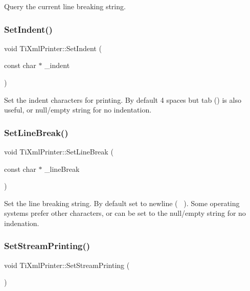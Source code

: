 Query the current line breaking string. 

\mbox{\label{class_ti_xml_printer_a213377a4070c7e625bae59716b089e5e}} 
\subsubsection{\texorpdfstring{Set\+Indent()}{SetIndent()}}
{\footnotesize\ttfamily void Ti\+Xml\+Printer\+::\+Set\+Indent (\begin{DoxyParamCaption}\item[{const char $\ast$}]{\+\_\+indent }\end{DoxyParamCaption})\hspace{0.3cm}{\ttfamily [inline]}}

Set the indent characters for printing. By default 4 spaces but tab () is also useful, or null/empty string for no indentation. \mbox{\label{class_ti_xml_printer_a4be1e37e69e3858c59635aa947174fe6}} 
\subsubsection{\texorpdfstring{Set\+Line\+Break()}{SetLineBreak()}}
{\footnotesize\ttfamily void Ti\+Xml\+Printer\+::\+Set\+Line\+Break (\begin{DoxyParamCaption}\item[{const char $\ast$}]{\+\_\+line\+Break }\end{DoxyParamCaption})\hspace{0.3cm}{\ttfamily [inline]}}

Set the line breaking string. By default set to newline (~\newline
). Some operating systems prefer other characters, or can be set to the null/empty string for no indenation. \mbox{\label{class_ti_xml_printer_ab23a90629e374cb1cadca090468bbd19}} 
\subsubsection{\texorpdfstring{Set\+Stream\+Printing()}{SetStreamPrinting()}}
{\footnotesize\ttfamily void Ti\+Xml\+Printer\+::\+Set\+Stream\+Printing (\begin{DoxyParamCaption}{ }\end{DoxyParamCaption})\hspace{0.3cm}{\ttfamily [inline]}}

